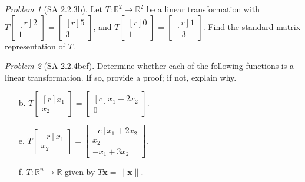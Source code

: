 \documentclass[fleqn,11pt]{paper}
\theoremstyle{remark}
\newtheorem{problem}{Problem}
\newtheorem*{solution}{{\bf Solution}}
\newcommand\R{\fld{R}}
\renewcommand{\vec}[1]{\mathbf{#1}}
\newcommand{\<}{\ensuremath{\langle}}
\renewcommand{\>}{\ensuremath{\rangle}}
\newcommand\fld[1]{\ensuremath{\mathbb{#1}}}
\newcommand\vx{\vec{x}}
\begin{document}
\begin{problem}[SA 2.2.3b]
  Let $T : \R^2 \to \R^2$ be a linear transformation with
  $T\begin{bmatrix*}[r] 2 \\ 1\end{bmatrix*} = \begin{bmatrix*}[r] 5 \\ 3\end{bmatrix*}$,
    and 
    $T\begin{bmatrix*}[r] 0 \\ 1\end{bmatrix*} = \begin{bmatrix*}[r] 1 \\ -3\end{bmatrix*}$.
      Find the standard matrix representation of $T$.
\end{problem}
\newpage


\begin{problem}[SA 2.2.4bef]
  Determine whether each of the following functions is a linear transformation. If so,
  provide a proof; if not, explain why.
  \begin{enumerate}
  \item[b.]  
    $T\begin{bmatrix*}[r] x_1 \\ x_2\end{bmatrix*} = \begin{bmatrix*}[c]  x_1 + 2x_2 \\ 0\end{bmatrix*}$.
  \item[e.]  
    $T\begin{bmatrix*}[r] x_1 \\ x_2\end{bmatrix*} = \begin{bmatrix*}[c]  x_1 + 2x_2 \\ x_2\\-x_1+3x_2\end{bmatrix*}$.
  \item[f.]  
    $T: \R^n \to \R$ given by $T\vx = \|\vx\|$.
  \end{enumerate}
\end{problem}
\newpage
\end{document}
